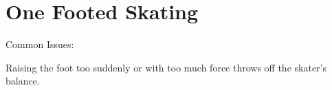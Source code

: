 \chapter{One Footed Skating}
\label{ch:one_foot}


Common Issues:

Raising the foot too suddenly or with too much force throws off the skater's balance.    

